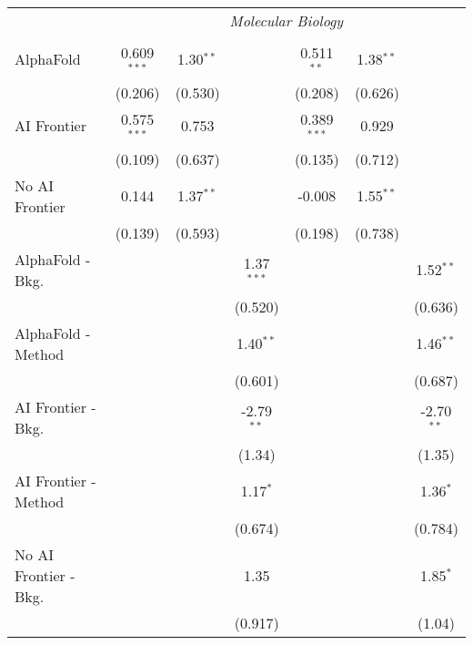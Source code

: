 \begin{tabular}{lcccccc}
 & \multicolumn{6}{c}{\textit{Molecular Biology}} \\ \\
   AlphaFold               & 0.609$^{***}$ & 1.30$^{**}$ &              & 0.511$^{**}$  & 1.38$^{**}$ &   \\   
                           & (0.206)       & (0.530)     &              & (0.208)       & (0.626)     &   \\   
   AI Frontier             & 0.575$^{***}$ & 0.753       &              & 0.389$^{***}$ & 0.929       &   \\   
                           & (0.109)       & (0.637)     &              & (0.135)       & (0.712)     &   \\   
   No AI Frontier          & 0.144         & 1.37$^{**}$ &              & -0.008        & 1.55$^{**}$ &   \\   
                           & (0.139)       & (0.593)     &              & (0.198)       & (0.738)     &   \\   
   AlphaFold - Bkg.        &               &             & 1.37$^{***}$ &               &             & 1.52$^{**}$\\   
                           &               &             & (0.520)      &               &             & (0.636)\\   
   AlphaFold - Method      &               &             & 1.40$^{**}$  &               &             & 1.46$^{**}$\\   
                           &               &             & (0.601)      &               &             & (0.687)\\   
   AI Frontier - Bkg.      &               &             & -2.79$^{**}$ &               &             & -2.70$^{**}$\\   
                           &               &             & (1.34)       &               &             & (1.35)\\   
   AI Frontier - Method    &               &             & 1.17$^{*}$   &               &             & 1.36$^{*}$\\   
                           &               &             & (0.674)      &               &             & (0.784)\\   
   No AI Frontier - Bkg.   &               &             & 1.35         &               &             & 1.85$^{*}$\\   
                           &               &             & (0.917)      &               &             & (1.04)\\   

\end{tabular}
